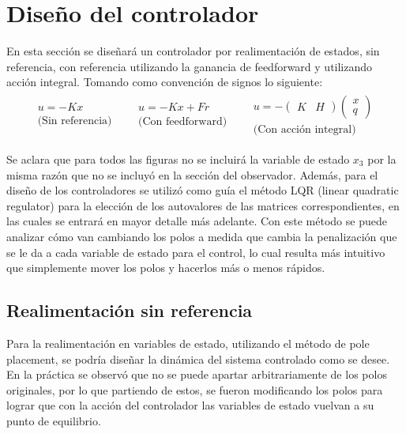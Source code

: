 \documentclass[a4paper,10pt]{article}
\begin{document}
\section{Diseño del controlador}
En esta sección se diseñará un controlador por realimentación de estados, sin referencia, con referencia utilizando la ganancia de feedforward y utilizando acción integral. Tomando como convención de signos lo siguiente: 
\begin{align*}
    \begin{gathered}
        u = -K x \\ \text{(Sin referencia)}    
    \end{gathered} && 
    \begin{gathered}
        u = -K x + Fr \\ \text{(Con feedforward)}    
    \end{gathered} && 
    \begin{gathered}
        u = -\begin{pmatrix} K & H \end{pmatrix} \begin{pmatrix} x \\ q \end{pmatrix} \\ 
        \text{(Con acción integral)}    
    \end{gathered} 
\end{align*}

Se aclara que para todos las figuras no se incluirá la variable de estado $x_3$ por la misma razón que no se incluyó en la sección del observador. Además, para el diseño de los controladores se utilizó como guía el método LQR (linear quadratic regulator) para la elección de los autovalores de las matrices correspondientes, en las cuales se entrará en mayor detalle más adelante. Con este método se puede analizar cómo van cambiando los polos a medida que cambia la penalización que se le da a cada variable de estado para el control, lo cual resulta más intuitivo que simplemente mover los polos y hacerlos más o menos rápidos.  


\subsection{Realimentación sin referencia}

Para la realimentación en variables de estado, utilizando el método de pole placement, se podría diseñar la dinámica del sistema controlado como se desee. En la práctica se observó que no se puede apartar arbitrariamente de los polos originales, por lo que partiendo de estos, se fueron modificando los polos para lograr que con la acción del controlador las variables de estado vuelvan a su punto de equilibrio. 
\end{document}

